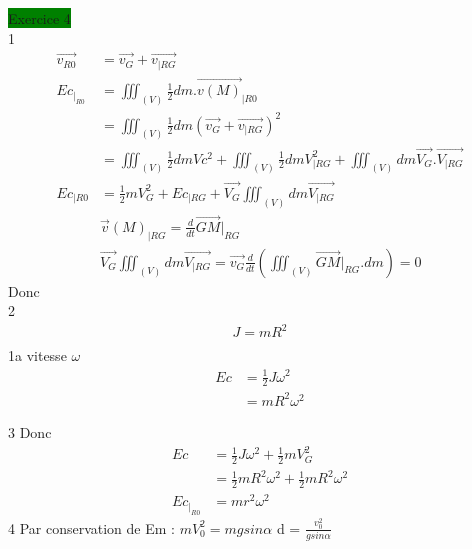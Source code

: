 \documentclass[a4paper,twocolumn,landscape]{article}
\begin{document}
\noindent \colorbox{green}{Exercice 4}\\
1 \begin{align*}
    \vec{v_{R0}} &= \vec{v_G} + \vec{v_{|RG}}\\
    Ec_{|_{R0}} &= \iiint_{(V)} \frac{1}{2}dm.\vec{v(M)}_{|R0}\\
    &= \iiint_{(V)} \frac{1}{2} dm (\vec{v_G} + \vec{v_{|RG}})^2\\
    &= \iiint_{(V)} \frac{1}{2}dm Vc^2 + \iiint_{(V)} \frac{1}{2}dm V_{|RG}^2 + \iiint_{(V)} dm\vec{V_G}.\vec{V_{|RG}}\\
    Ec_{|R0} &= \frac{1}{2}mV_G^2 + Ec_{|RG} + \vec{V_G} \iiint_{(V)} dm\vec{V_{|RG}}\\
    &\vec{v}(M)_{|RG} = \frac{d}{dt} \vec{GM}|_{RG}\\
    &\vec{V_G} \iiint_{(V)} dm\vec{V_{|RG}} = \vec{v_G}\frac{d}{dt}(\iiint_{(V)} \vec{GM}|_{RG}.dm) = 0
\end{align*}
Donc \\
2 \begin{align*}
    J = mR^2\\
\end{align*}
1a vitesse \(\omega\)\begin{align*}
    Ec &= \frac{1}{2}J\omega^2\\
    &= mR^2\omega^2 
\end{align*}

3 Donc \begin{align*}
    Ec &= \frac{1}{2}J\omega^2 + \frac{1}{2}mV_G^2\\
    &= \frac{1}{2}mR^2\omega^2 + \frac{1}{2}mR^2\omega^2\\
    Ec_{|_{R0}} &= mr^2\omega^2
\end{align*}
4 Par conservation de Em : 
\(mV_0^2 = mgsin\alpha\)
d = \(\frac{v_0^2}{gsin\alpha}\)
\end{document}
